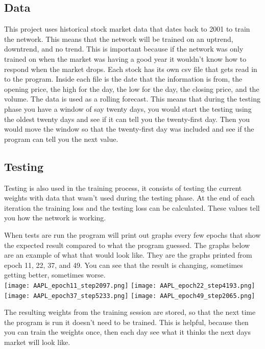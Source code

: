 \documentclass{article}
\begin{document}
\subsection{Data}
This project uses historical stock market data that dates back to 2001 to train the network. This means that the network will be trained on an uptrend, downtrend, and no trend.
This is important because if the network was only trained on when the market was having a good year it wouldn't know how to respond when the market drops.
Each stock has its own csv file that gets read in to the program.
Inside each file is the date that the information is from, the opening price, the high for the day, the low for the day, the closing price, and the volume.
The data is used as a rolling forecast.
This means that during the testing phase you have a window of say twenty days, you would start the testing using the oldest twenty days and see if it can tell you the twenty-first day.
Then you would move the window so that the twenty-first day was included and see if the program can tell you the next value.

\subsection{Testing}
Testing is also used in the training process, it consists of testing the current weights with data that wasn't used during the testing phase. 
At the end of each iteration the training loss and the testing loss can be calculated.
These values tell you how the network is working.

When tests are run the program will print out graphs every few epochs that show the expected result compared to what the program guessed. 
The graphs below are an example of what that would look like.
They are the graphs printed from epoch 11, 22, 37, and 49.
You can see that the result is changing, sometimes getting better, sometimes worse.\\	

\texttt{[image: AAPL\_epoch11\_step2097.png]}
\texttt{[image: AAPL\_epoch22\_step4193.png]}\\


\texttt{[image: AAPL\_epoch37\_step5233.png]}
\texttt{[image: AAPL\_epoch49\_step2065.png]}

The resulting weights from the training session are stored, so that the next time the program is run it doesn't need to be trained.
This is helpful, because then you can train the weights once, then each day see what it thinks the next days market will look like.
\end{document}
